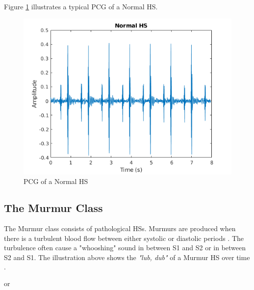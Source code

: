 \documentclass[10pt,twocolumn]{witseiepaper}
\begin{document}
Figure \ref{fig:normal} illustrates a typical PCG of a Normal HS.
\begin{figure}[h!]
    \centering
    \includegraphics[scale = 0.45]{./normal.png}
    \caption{PCG of a Normal HS}
    \label{fig:normal}
\end{figure}{}

\subsection*{The Murmur Class}
The Murmur class consists of pathological HSs. Murmurs are produced when there is a turbulent blood flow between either systolic or diastolic periods \cite{35}. The turbulence often cause a "whooshing" sound in between S1 and S2 or in between S2 and S1. The illustration above shows the \textit{"lub, dub"} of a Murmur HS over time \cite{bentley}.


\hspace{3.5cm} or 

\end{document}
